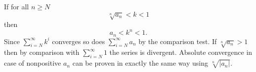 \documentclass[12pt]{article}
\begin{document}
If for all $n\geq N$
$$\sqrt[n]{a_n}<k<1$$
then
$$a_n<k^n<1.$$
Since $\sum_{i=N}^\infty k^i$ converges so does $\sum_{i=N}^\infty a_n$ by the comparison test. If $\sqrt[n]{a_n}>1$ then by comparison with $\sum_{i=N}^\infty 1$ the series is divergent. Absolute convergence in case of nonpositive $a_n$ can be proven in exactly the same way using $\sqrt[n]{|a_n|}$.
\end{document}
